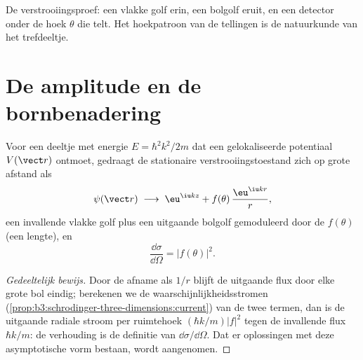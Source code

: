 \begin{omfigure}

{\small De verstrooiingsproef: een vlakke golf erin, een bolgolf eruit, en
een detector onder de hoek $\theta$ die telt. Het hoekpatroon van de
tellingen is de natuurkunde van het trefdeeltje.}
\end{omfigure}

\section{De amplitude en de bornbenadering}

\begin{theorem}\label{thm:b3:scattering-theory:amplitude}
Voor een deeltje met energie $E = \hbar^2k^2/2m$ dat een gelokaliseerde
potentiaal $V(\vect r)$ ontmoet, gedraagt de stationaire
verstrooiingstoestand zich op grote afstand als
\[
\psi(\vect r) \;\longrightarrow\;
\eu^{\iu kz} + f(\theta)\,\frac{\eu^{\iu kr}}{r} ,
\]
een invallende vlakke golf plus een uitgaande bolgolf gemoduleerd door de
\emph{} $f(\theta)$ (een lengte), en
\[
\frac{\dd\sigma}{\dd\Omega} = |f(\theta)|^2 .
\]
\end{theorem}

\begin{proof}[Gedeeltelijk bewijs]
Door de afname als $1/r$ blijft de uitgaande flux door elke grote bol
eindig; berekenen we de waarschijnlijkheidsstromen
(\cref{prop:b3:schrodinger-three-dimensions:current}) van de twee termen,
dan is de uitgaande radiale stroom per ruimtehoek $(\hbar k/m)|f|^2$ tegen
de invallende flux $\hbar k/m$: de verhouding is de definitie van
$\dd\sigma/\dd\Omega$. Dat er oplossingen met deze asymptotische vorm
bestaan, wordt aangenomen.
\end{proof}

